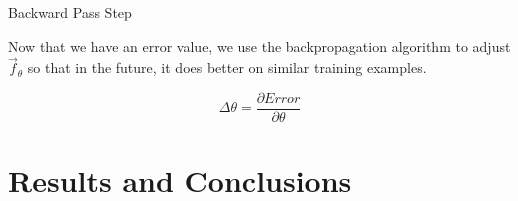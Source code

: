 \documentclass[aspectratio=169, 12pt]{beamer}
\begin{document}
\begin{frame}{Backward Pass Step}

    Now that we have an error value, we use the backpropagation algorithm to adjust $\vec{f}_\theta$ so that in the future, it does better on similar training examples. 

    \[
    \Delta \theta = \frac{\partial Error}{\partial \theta}
    \]
    
\end{frame}

\section{Results and Conclusions}
\end{document}
